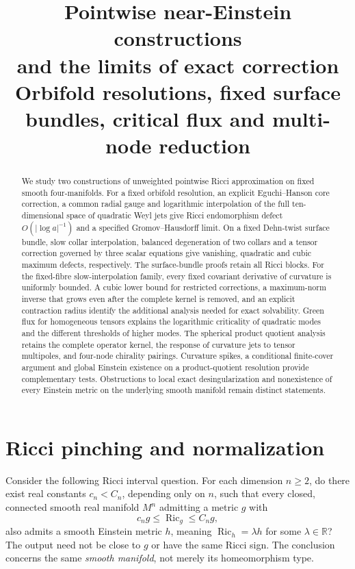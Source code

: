 \documentclass[a4paper,11pt]{article}
\title{Pointwise near-Einstein constructions\\and the limits of exact correction\\[0.5em]{\large Orbifold resolutions, fixed surface bundles, critical flux and multi-node reduction}}
\author{}
\date{}
\numberwithin{equation}{section}
\theoremstyle{definition}
\newcommand{\Ric}{\operatorname{Ric}}
\newcommand{\R}{\mathbb R}
\begin{document}
\maketitle
\begin{abstract}
We study two constructions of unweighted pointwise Ricci approximation on fixed smooth four-manifolds. For a fixed orbifold resolution, an explicit Eguchi--Hanson core correction, a common radial gauge and logarithmic interpolation of the full ten-dimensional space of quadratic Weyl jets give Ricci endomorphism defect $O(|\log a|^{-1})$ and a specified Gromov--Hausdorff limit. On a fixed Dehn-twist surface bundle, slow collar interpolation, balanced degeneration of two collars and a tensor correction governed by three scalar equations give vanishing, quadratic and cubic maximum defects, respectively. The surface-bundle proofs retain all Ricci blocks. For the fixed-fibre slow-interpolation family, every fixed covariant derivative of curvature is uniformly bounded. A cubic lower bound for restricted corrections, a maximum-norm inverse that grows even after the complete kernel is removed, and an explicit contraction radius identify the additional analysis needed for exact solvability. Green flux for homogeneous tensors explains the logarithmic criticality of quadratic modes and the different thresholds of higher modes. The spherical product quotient analysis retains the complete operator kernel, the response of curvature jets to tensor multipoles, and four-node chirality pairings. Curvature spikes, a conditional finite-cover argument and global Einstein existence on a product-quotient resolution provide complementary tests. Obstructions to local exact desingularization and nonexistence of every Einstein metric on the underlying smooth manifold remain distinct statements.
\end{abstract}
\begingroup
\small\linespread{1.0}\selectfont\setlength{\parskip}{0pt}
\tableofcontents
\endgroup
\clearpage

\section{Ricci pinching and normalization}
Consider the following Ricci interval question. For each dimension $n\ge2$, do there exist real constants $c_n<C_n$, depending only on $n$, such that every closed, connected smooth real manifold $M^n$ admitting a metric $g$ with
\begin{equation}\label{eq:Q}
 c_ng\le\Ric_g\le C_ng,
\end{equation}
also admits a smooth Einstein metric $h$, meaning $\Ric_h=\lambda h$ for some $\lambda\in\R$? The output need not be close to $g$ or have the same Ricci sign. The conclusion concerns the same \emph{smooth manifold}, not merely its homeomorphism type.
\end{document}
